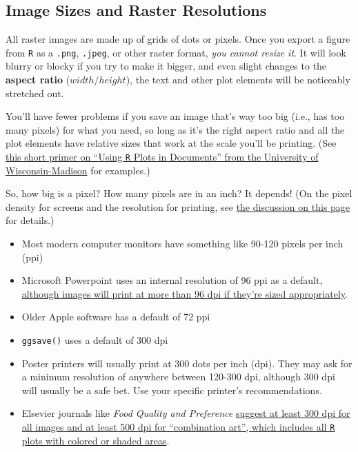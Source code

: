 \documentclass[
]{book}
\providecommand{\tightlist}{%
  \setlength{\itemsep}{0pt}\setlength{\parskip}{0pt}}
\begin{document}
\hypertarget{image-sizes-and-raster-resolutions}{%
\subsection{Image Sizes and Raster Resolutions}\label{image-sizes-and-raster-resolutions}}

All raster images are made up of grids of dots or pixels. Once you export a figure from \texttt{R} as a \texttt{.png}, \texttt{.jpeg}, or other raster format, \emph{you cannot resize it}. It will look blurry or blocky if you try to make it bigger, and even slight changes to the \textbf{aspect ratio} (\(width/height\)), the text and other plot elements will be noticeably stretched out.

You'll have fewer problems if you save an image that's way too big (i.e., has too many pixels) for what you need, so long as it's the right aspect ratio and all the plot elements have relative sizes that work at the scale you'll be printing. (See \href{https://sscc.wisc.edu/sscc/pubs/using-r-plots/saving-plots.html\#file-dimensions}{this short primer on ``Using \texttt{R} Plots in Documents'' from the University of Wisconsin-Madison} for examples.)

So, how big is a pixel? How many pixels are in an inch? It depends! (On the pixel density for screens and the resolution for printing, see \href{https://graphicdesign.stackexchange.com/questions/6080/what-is-the-difference-between-dpi-dots-per-inch-and-ppi-pixels-per-inch}{the discussion on this page} for details.)

\begin{itemize}
\tightlist
\item
  Most modern computer monitors have something like 90-120 pixels per inch (ppi)
\item
  Microsoft Powerpoint uses an internal resolution of 96 ppi as a default, \href{https://www.brightcarbon.com/blog/powerpoint-picture-size-and-resolution/}{although images will print at more than 96 dpi if they're sized appropriately}.
\item
  Older Apple software has a default of 72 ppi
\item
  \texttt{ggsave()} uses a default of 300 dpi
\item
  Poster printers will usually print at 300 dots per inch (dpi). They may ask for a minimum resolution of anywhere between 120-300 dpi, although 300 dpi will usually be a safe bet. Use your specific printer's recommendations.
\item
  Elsevier journals like \emph{Food Quality and Preference} \href{https://www.elsevier.com/about/policies-and-standards/author/artwork-and-media-instructions/artwork-sizing}{suggest at least 300 dpi for all images and at least 500 dpi for ``combination art'', which includes all \texttt{R} plots with colored or shaded areas}.
\end{itemize}
\end{document}
